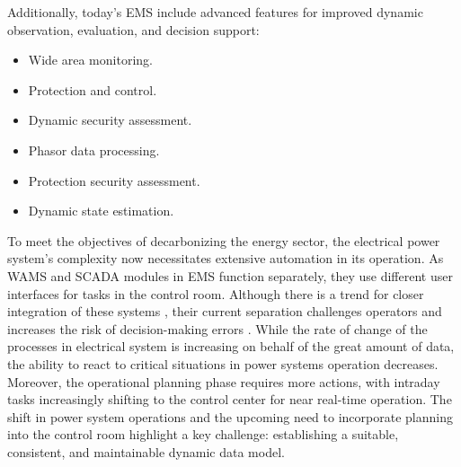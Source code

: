 Additionally, today's EMS include advanced features for improved dynamic observation, evaluation, and decision support:
\begin{itemize}
    \item Wide area monitoring.
    \item Protection and control.
    \item Dynamic security assessment.
    \item Phasor data processing.
    \item Protection security assessment.
    \item Dynamic state estimation.
\end{itemize}

To meet the objectives of decarbonizing the energy sector, the electrical power system's complexity now necessitates extensive automation in its operation. As WAMS and SCADA modules in EMS function separately, they  use different user interfaces for tasks in the control room. Although there is a trend for closer integration of these systems \autocite{entsoe_dsa_2017}, their current separation challenges operators and increases the risk of decision-making errors \autocite{PANTELI2015140}. While the rate of change of the processes in electrical system is increasing on behalf of the great amount of data, the ability to react to critical situations in power systems operation decreases. Moreover, the operational planning phase requires more actions, with intraday tasks increasingly shifting to the control center for near real-time operation. The shift in power system operations and the upcoming need to incorporate planning into the control room highlight a key challenge: establishing a suitable, consistent, and maintainable dynamic data model.
